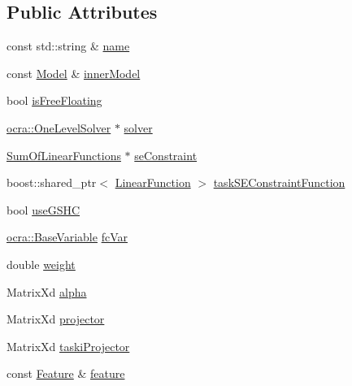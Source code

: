 \subsection*{Public Attributes}
\begin{DoxyCompactItemize}
\item 
const std\+::string \& \hyperlink{structgocra_1_1GHCJTTask_1_1Pimpl_a62bf1c09164be6cf8a48360bd6e53d64}{name}
\item 
const \hyperlink{classocra_1_1Model}{Model} \& \hyperlink{structgocra_1_1GHCJTTask_1_1Pimpl_a7f03506d78950aa1a986d2ba44142f28}{inner\+Model}
\item 
bool \hyperlink{structgocra_1_1GHCJTTask_1_1Pimpl_a3fefbc36e9c5e9b8c4fc8f85fb19da53}{is\+Free\+Floating}
\item 
\hyperlink{classocra_1_1OneLevelSolver}{ocra\+::\+One\+Level\+Solver} $\ast$ \hyperlink{structgocra_1_1GHCJTTask_1_1Pimpl_ac9f3b5650e8663982f631c354a25e3b9}{solver}
\item 
\hyperlink{classocra_1_1SumOfLinearFunctions}{Sum\+Of\+Linear\+Functions} $\ast$ \hyperlink{structgocra_1_1GHCJTTask_1_1Pimpl_ab0953e75c824e2aa63477976b94a1806}{se\+Constraint}
\item 
boost\+::shared\+\_\+ptr$<$ \hyperlink{classocra_1_1LinearFunction}{Linear\+Function} $>$ \hyperlink{structgocra_1_1GHCJTTask_1_1Pimpl_ab1b71cfa2f203377834f529d2c0e98c3}{task\+S\+E\+Constraint\+Function}
\item 
bool \hyperlink{structgocra_1_1GHCJTTask_1_1Pimpl_a0beb46ac94216a28202956bf87fc1d2d}{use\+G\+S\+HC}
\item 
\hyperlink{classocra_1_1BaseVariable}{ocra\+::\+Base\+Variable} \hyperlink{structgocra_1_1GHCJTTask_1_1Pimpl_a98ad4a4d2e7bbba67daa244e45f75345}{fc\+Var}
\item 
double \hyperlink{structgocra_1_1GHCJTTask_1_1Pimpl_a5bf2a2e00bd9406bb6a993b616a47d07}{weight}
\item 
Matrix\+Xd \hyperlink{structgocra_1_1GHCJTTask_1_1Pimpl_a71d5221274d0ee84040992042d609cec}{alpha}
\item 
Matrix\+Xd \hyperlink{structgocra_1_1GHCJTTask_1_1Pimpl_ab17e7af214e9801bfb03e4d9ed6dad29}{projector}
\item 
Matrix\+Xd \hyperlink{structgocra_1_1GHCJTTask_1_1Pimpl_a0ae67b26b52f69987d41bc3232636ccb}{taski\+Projector}
\item 
const \hyperlink{classocra_1_1Feature}{Feature} \& \hyperlink{structgocra_1_1GHCJTTask_1_1Pimpl_aa7c75169490e6b35ff7bdb1baf696c5d}{feature}
\item 

\end{DoxyCompactItemize}
